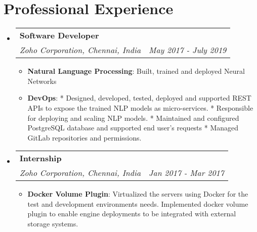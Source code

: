 \documentclass[letterpaper,11pt]{article}
\makeatletter
\newcommand{\resumeItem}[2]{
  \item\small{
    \textbf{#1}{: #2 \vspace{-2pt}}
  }
}
\newcommand{\resumeSubheading}[4]{
  \vspace{-1pt}\item
    \begin{tabular*}{0.97\textwidth}[t]{l@{\extracolsep{\fill}}r}
      \textbf{#1} & #2 \\
      \textit{\small#3} & \textit{\small #4} \\
    \end{tabular*}\vspace{-5pt}
}
\newcommand{\resumeSubHeadingListStart}{\begin{itemize}[leftmargin=*]}
\newcommand{\resumeSubHeadingListEnd}{\end{itemize}}
\newcommand{\resumeItemListStart}{\begin{itemize}}
\newcommand{\resumeItemListEnd}{\end{itemize}\vspace{-5pt}}
\makeatother
\begin{document}
\section{Professional Experience}
  \resumeSubHeadingListStart

    \resumeSubheading
      {Software Developer}{}
      {Zoho Corporation, Chennai, India}{May 2017 - July 2019}
      \resumeItemListStart
        \resumeItem{Natural Language Processing}
        {Built, trained and deployed Neural Networks}
        \resumeItem{DevOps}
          {* Designed, developed, tested, deployed and supported REST APIs to expose the trained NLP models as micro-services. * Responsible for deploying and scaling NLP models. * Maintained and configured PostgreSQL database and supported end user's requests * Managed GitLab repositories and permissions.}
      \resumeItemListEnd
    \resumeSubheading
      {Internship}{}
      {Zoho Corporation, Chennai, India}{Jan 2017 - Mar 2017}
      \resumeItemListStart
        \resumeItem{Docker Volume Plugin}
        {Virtualized the servers using Docker for the test and development environments needs. Implemented docker volume plugin to enable engine deployments to be integrated with external storage systems.}
        \resumeItemListEnd
  \resumeSubHeadingListEnd

\end{document}
